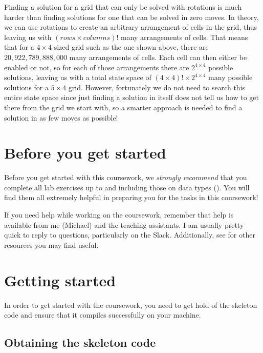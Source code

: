 Finding a solution for a grid that can only be solved with rotations is much harder than finding solutions for one that can be solved in zero moves. In theory, we can use rotations to create an arbitrary arrangement of cells in the grid, thus leaving us with $(\mathit{rows} \times \mathit{columns})!$ many arrangements of cells. That means that for a $4 \times 4$ sized grid such as the one shown above, there are $20,922,789,888,000$ many arrangements of cells. Each cell can then either be enabled or not, so for each of those arrangements there are $2^{4 \times 4}$ possible solutions, leaving us with a total state space of $(4 \times 4)! \times 2^{4 \times 4}$ many possible solutions for a $5 \times 4$ grid. However, fortunately we do not need to search this entire state space since just finding a solution in itself does not tell us how to get there from the grid we start with, so a smarter approach is needed to find a solution in as few moves as possible!


\section{Before you get started}
\label{sec:cswk1-before-you-start}

Before you get started with this coursework, we \emph{strongly recommend} that you complete all lab exercises up to and including those on data types (). You will find them all extremely helpful in preparing you for the tasks in this coursework!

If you need help while working on the coursework, remember that help is available from me (Michael) and the teaching assistants. I am usually pretty quick to reply to questions, particularly on the Slack. Additionally, see  for other resources you may find useful.


\section{Getting started}
\label{sec:cswk1-getting-started}

In order to get started with the coursework, you need to get hold of the skeleton code and ensure that it compiles successfully on your machine. 

\subsection{Obtaining the skeleton code}

